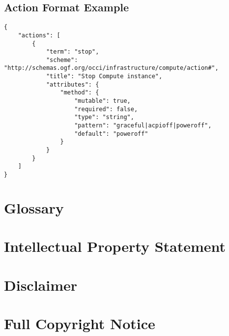 \documentclass[10pt,a4paper]{article}
\begin{document}
\subsection{Action Format Example}
\label{sec:example_action}

\begin{verbatim}
{
    "actions": [
        {
            "term": "stop",
            "scheme":
"http://schemas.ogf.org/occi/infrastructure/compute/action#",
            "title": "Stop Compute instance",
            "attributes": {
                "method": {
                    "mutable": true,
                    "required": false,
                    "type": "string",
                    "pattern": "graceful|acpioff|poweroff",
                    "default": "poweroff"
                }
            }
        }
    ]
}
\end{verbatim}

\section{Glossary}
\label{sec:glossary}


%

\section{Intellectual Property Statement}


\section{Disclaimer}


\section{Full Copyright Notice}




\end{document}
